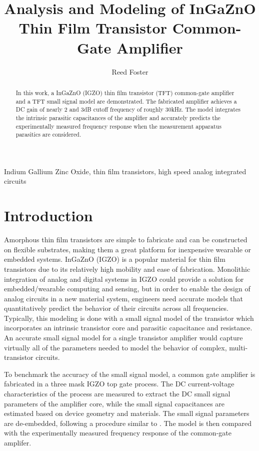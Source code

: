 \documentclass[conference]{IEEEtran}
\begin{document}
\title{Analysis and Modeling of InGaZnO Thin Film Transistor Common-Gate Amplifier}

\author{Reed Foster}

\maketitle

\begin{abstract}
    In this work, a InGaZnO (IGZO) thin film transistor (TFT) common-gate amplifier and a TFT small signal model are demonstrated.
    The fabricated amplifier achieves a DC gain of nearly 2 and 3dB cutoff frequency of roughly 30kHz.
    The model integrates the intrinsic parasitic capacitances of the amplifier and accurately predicts the experimentally measured frequency response when the measurement apparatus parasitics are considered.
\end{abstract}

\begin{IEEEkeywords}
    Indium Gallium Zinc Oxide, thin film transistors, high speed analog integrated circuits
\end{IEEEkeywords}

\section{Introduction}
Amorphous thin film transistors are simple to fabricate and can be constructed on flexible substrates, making them a great platform for inexpensive wearable or embedded systems.
InGaZnO (IGZO) is a popular material for thin film transistors due to its relatively high mobility and ease of fabrication\cite{Nomura}.
Monolithic integration of analog and digital systems in IGZO could provide a solution for embedded/wearable computing and sensing,
but in order to enable the design of analog circuits in a new material system,
engineers need accurate models that quantitatively predict the behavior of their circuits across all frequencies.
Typically, this modeling is done with a small signal model of the transistor which incorporates an intrinsic transistor core and parasitic capacitance and resistance.
An accurate small signal model for a single transistor amplifier would capture virtually all of the parameters needed to model the behavior of complex, multi-transistor circuits.

To benchmark the accuracy of the small signal model, a common gate amplifier is fabricated in a three mask IGZO top gate process.
The DC current-voltage characteristics of the process are measured to extract the DC small signal parameters of the amplifier core, while the small signal capacitances are estimated based on device geometry and materials.
The small signal parameters are de-embedded, following a procedure similar to \cite{Cheng}.
The model is then compared with the experimentally measured frequency response of the common-gate amplifer.
\end{document}
